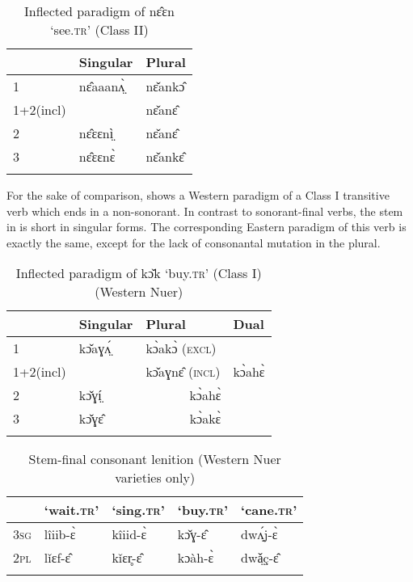 \documentclass[output=paper,newtxmath,modfonts,nonflat,draftmode]{langsci/langscibook}
\begin{document}
\begin{table}
\begin{tabularx}{\textwidth}{XXl} 
\lsptoprule
& Singular & {Plural}\\
\midrule
1 & nɛ̂aaanʌ̤̀ & {nɛ̌ankɔ̂ } \\
1+2(incl) & & nɛ̌anɛ̂ \\
2 & nɛ̂ɛɛnì̤ & {nɛ̌anɛ̂}\\
3 & nɛ̂ɛɛnɛ̀ & {nɛ̌ankɛ̂}\\
\lspbottomrule
\end{tabularx}
\caption{Inflected paradigm of nɛ̂ɛn ‘see.\textsc{tr}’ (Class II)}
\label{tab:monich:9}
\end{table}
 
For the sake of comparison,  shows a Western  paradigm of a Class I transitive verb which ends in a non-sonorant. In contrast to sonorant-final verbs, the stem in  is short in singular forms. The corresponding Eastern  paradigm of this verb is exactly the same, except for the lack of consonantal mutation in the plural.



\begin{table}[t]
\begin{tabularx}{\textwidth}{XXXl} 
\lsptoprule
& Singular &{Plural} & Dual\\
\midrule
1 & kɔ̌aɣʌ̤́ & {kɔ̀akɔ̀ (\textsc{excl})} \\
1+2(incl)  &      &  kɔ̌aɣnɛ̂ (\textsc{incl}) & kɔ̀ahɛ̀ \\
2 & kɔ̌ɣí̤ & \multicolumn{2}{c}{kɔ̀ahɛ̀}\\
3 & kɔ̌ɣɛ̂ & \multicolumn{2}{c}{kɔ̀akɛ̀}\\
\lspbottomrule
\end{tabularx}
\caption{Inflected paradigm of kɔ̌k ‘buy.\textsc{tr}’ (Class I) (Western Nuer)}
\label{tab:monich:10}
\end{table}
 
\begin{table}[t]
\begin{tabularx}{\textwidth}{XXXXX} 
\lsptoprule
& ‘wait.\textsc{tr}’ & ‘sing.\textsc{tr}’ & ‘buy.\textsc{tr}’ & ‘cane.\textsc{tr}’\\
\midrule
3\textsc{sg} & lîiib-ɛ̀ & kîiid-ɛ̀ & kɔ̌ɣ-ɛ̂ & dwʌ̤́j-ɛ̀\\
2\textsc{pl} & lǐɛf-ɛ̂ & kǐɛr̥-ɛ̂ & kɔàh-ɛ̀ & dwǎ̤ç-ɛ̂\\
\lspbottomrule
\end{tabularx}
\caption{Stem-final consonant lenition (Western Nuer varieties only)}
\label{tab:monich:11}
\end{table} 
\end{document}
